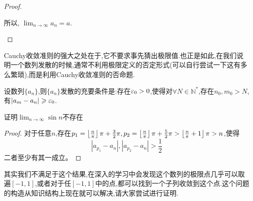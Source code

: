 \begin{proof}
\begin{enumerate}
            所以, $\lim_{n \to \infty} a_n = a$.




    \end{enumerate}
\end{proof}

Cauchy收敛准则的强大之处在于,它不要求事先猜出极限值.也正是如此,在我们说明一个数列发散的时候,通常不利用极限定义的否定形式(可以自行尝试一下这有多么繁琐),而是利用Cauchy收敛准则的否命题.

\begin{proposition}[Cachuy收敛准则的否命题]
    设数列$\{a_n\}$,则$\{a_n\}$发散的充要条件是:存在$\ve_0 >0$,使得对$\forall N\in \mathbb{N}^*$,存在$n_0,m_0>N$,有$|a_m-a_n|\ges \ve_0$.
\end{proposition}

\begin{example}
    证明$\lim_{n \to \infty} \sin n $不存在
    \begin{proof}
        对于任意$n$,存在$p_1 = \left\lfloor  \frac n{\pi} \right\rfloor \pi +\frac32\pi,p_2 = \llfloor\frac n{\pi}\rrfloor\pi+\frac52\pi > \llfloor\frac{n}{\pi}+1\rrfloor\pi >n$,使得$$|a_{p_1}-a_n| , |a_{p_2}-a_n|>\frac12$$二者至少有其一成立。

    \end{proof}

\end{example}
\begin{remark}
    其实我们不满足于这个结果,在深入的学习中会发现这个数列的极限点几乎可以取遍$[-1,1]$,或者对于任$[-1,1]$中的点,都可以找到一个子列收敛到这个点.这个问题的构造从知识结构上现在就可以解决,请大家尝试进行证明.
\end{remark}

